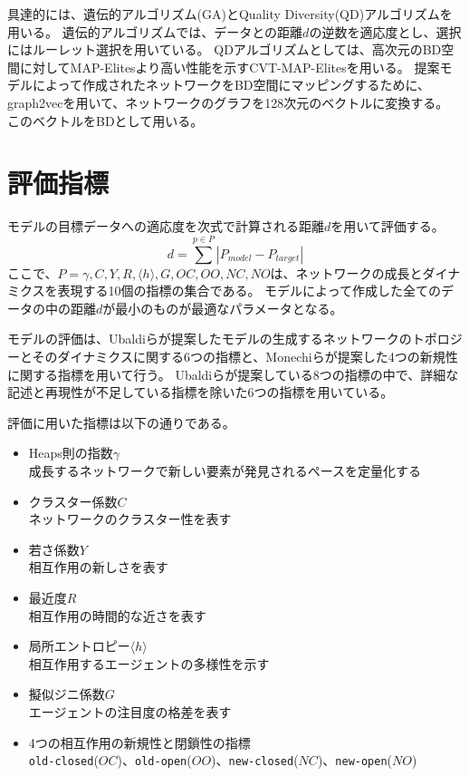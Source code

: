 \documentclass[uplatex,11pt,openany]{ujreport}
\begin{document}
        具達的には、遺伝的アルゴリズム(GA)とQuality Diversity(QD)アルゴリズムを用いる。
        遺伝的アルゴリズムでは、データとの距離$d$の逆数を適応度とし、選択にはルーレット選択を用いている。
        QDアルゴリズムとしては、高次元のBD空間に対してMAP-Elitesより高い性能を示すCVT-MAP-Elitesを用いる。
        提案モデルによって作成されたネットワークをBD空間にマッピングするために、graph2vecを用いて、ネットワークのグラフを128次元のベクトルに変換する。
        このベクトルをBDとして用いる。


    \section{評価指標}
        モデルの目標データへの適応度を次式で計算される距離$d$を用いて評価する。
        \begin{equation}
            d = \sum^{p\in P}|P_{model}-P_{target}|
        \end{equation}
        ここで、$P={\gamma,C,Y,R, \langle h\rangle ,G,OC,OO,NC,NO}$は、ネットワークの成長とダイナミクスを表現する10個の指標の集合である。
        モデルによって作成した全てのデータの中の距離$d$が最小のものが最適なパラメータとなる。

        モデルの評価は、Ubaldiらが提案したモデルの生成するネットワークのトポロジーとそのダイナミクスに関する6つの指標\cite{ubaldiEmergenceEvolutionSocial2021}と、Monechiらが提案した4つの新規性に関する指標\cite{monechiWavesNoveltiesExpansion2017}を用いて行う。
        Ubaldiらが提案している8つの指標の中で、詳細な記述と再現性が不足している指標を除いた6つの指標を用いている。

        評価に用いた指標は以下の通りである。
        \begin{itemize}
            \item Heaps則の指数$\gamma$\\成長するネットワークで新しい要素が発見されるペースを定量化する
            \item クラスター係数$C$\\ネットワークのクラスター性を表す
            \item 若さ係数$Y$\\相互作用の新しさを表す
            \item 最近度$R$\\相互作用の時間的な近さを表す
            \item 局所エントロピー$\langle h\rangle$\\相互作用するエージェントの多様性を示す
            \item 擬似ジニ係数$G$\\エージェントの注目度の格差を表す
            \item 4つの相互作用の新規性と閉鎖性の指標\\\verb|old-closed|($OC$)、\verb|old-open|($OO$)、\verb|new-closed|($NC$)、\verb|new-open|($NO$)
        \end{itemize}
\end{document}
